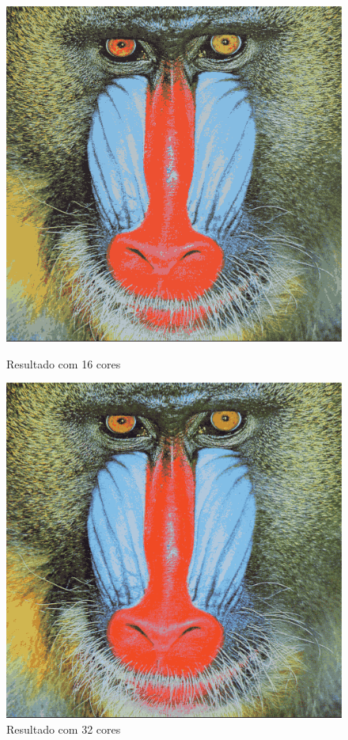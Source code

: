 \documentclass{article}
\begin{document}
\begin{figure}[!htb]
  \begin{minipage}{0.42\textwidth}
    \centering
    \includegraphics[width=.99\linewidth]{images/res16.png}
    \caption{Resultado com 16 cores}\label{Fig:res16}
  \end{minipage}\hfill
  \begin{minipage}{0.42\textwidth}
    \centering
    \includegraphics[width=.99\linewidth]{images/res32.png}
    \caption{Resultado com 32 cores}\label{Fig:res32}
  \end{minipage}
\end{figure}
\end{document}

